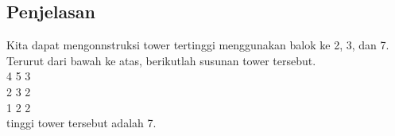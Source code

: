 \documentclass{article}
\begin{document}
\subsection*{Penjelasan}
Kita dapat mengonnstruksi tower tertinggi menggunakan balok ke 2, 3, dan 7.\\
Terurut dari bawah ke atas, berikutlah susunan tower tersebut.\\

4 5 3\\
2 3 2\\
1 2 2\\

tinggi tower tersebut adalah 7.

\pagebreak
\end{document}
